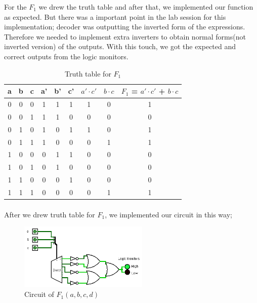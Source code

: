 \documentclass[pdftex,12pt,a4paper]{article}
\begin{document}
For the $F_{1}$ we drew the truth table and after that, we implemented our function as expected. But there was a important point in the lab session for this implementation; decoder was outputting the inverted form of the expressions. Therefore we needed to implement extra inverters to obtain normal forms(not inverted version) of the outputs. With this touch, we got the expected and correct outputs from the logic monitors.\newline
\begin{table}[h]
\centering
\begin{tabular}{|c|c|c|c|c|c|c|c|c|}
\hline
a & b & c & a' & b' & c' & $a' \cdot c'$ & $b \cdot c$ & $F_{1}$ = $a' \cdot c'$ + $b \cdot c$     \\ \hline
0 & 0 & 0 & 1  & 1  & 1  & 1             & 0      & 1             \\ \hline
0 & 0 & 1 & 1  & 1  & 0  & 0             & 0      & 0               \\ \hline
0 & 1 & 0 & 1  & 0  & 1  & 1             & 0      & 1              \\ \hline
0 & 1 & 1 & 1  & 0  & 0  & 0             & 1      & 1               \\ \hline
1 & 0 & 0 & 0  & 1  & 1  & 0             & 0      & 0               \\ \hline
1 & 0 & 1 & 0  & 1  & 0  & 0             & 0      & 0           \\ \hline
1 & 1 & 0 & 0  & 0  & 1  & 0             & 0      & 0          \\ \hline
1 & 1 & 1 & 0  & 0  & 0  & 0             & 1      & 1               \\ \hline
\end{tabular}
\caption{Truth table for $F_{1}$}
\label{truth3}
\end{table}

\paragraph{}
After we drew truth table for $F_{1}$, we implemented our circuit in this way;

\begin{figure}[!h]
	\centering
	\includegraphics[width=0.55\textwidth]{part4-1.png}	
	\caption{Circuit of $F_{1}(a,b,c,d)$}
	\label{log4}
\end{figure}
\clearpage
\end{document}
